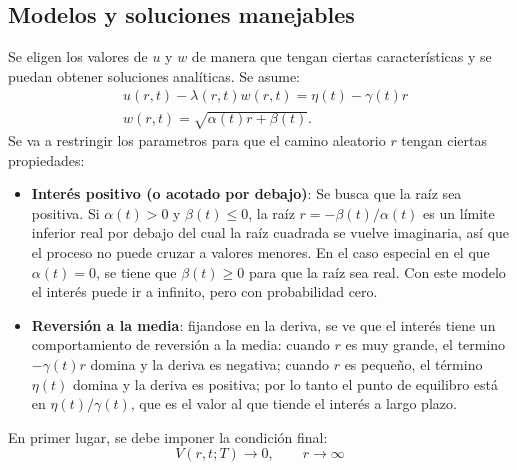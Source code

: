 \subsection{Modelos y soluciones manejables}
Se eligen los valores de $u$ y $w$ de manera que tengan ciertas características y se puedan obtener soluciones analíticas. Se asume:
\begin{equation}\label{eq:EDE_bono}
    \boxed{
        \begin{aligned}
            &u(r,t) - \lambda(r,t) w(r,t) = \eta(t) - \gamma(t) r \\
            &w(r,t) = \sqrt{\alpha(t) r + \beta(t)}.
        \end{aligned}
    }
\end{equation}
Se va a restringir los parametros para que el camino aleatorio $r$ tengan ciertas propiedades:
\begin{itemize}
    \item \textbf{Interés positivo (o acotado por debajo)}: Se busca que la raíz sea positiva. Si $\boxed{\alpha(t) > 0}$ y $\boxed{\beta(t) \leq 0}$, la raíz $r=-\beta(t)/\alpha(t)$ es un límite inferior real por debajo del cual la raíz cuadrada se vuelve imaginaria, así que el proceso no puede cruzar a valores menores. En el caso especial en el que $\boxed{\alpha(t) = 0}$, se tiene que $\boxed{\beta(t) \geq 0}$ para que la raíz sea real. Con este modelo el interés puede ir a infinito, pero con probabilidad cero.
    \item \textbf{Reversión a la media}: fijandose en la deriva, se ve que el interés tiene un comportamiento de reversión a la media: cuando $r$ es muy grande, el termino $- \gamma(t) r$ domina y la deriva es negativa; cuando $r$ es pequeño, el término $\eta(t)$ domina y la deriva es positiva; por lo tanto el punto de equilibro está en $\eta(t)/\gamma(t)$, que es el valor al que tiende el interés a largo plazo.
\end{itemize}

En primer lugar, se debe imponer la condición final:
\begin{equation*}
    \boxed{V(r, t; T) \to 0,  \qquad r \to \infty}
\end{equation*}

